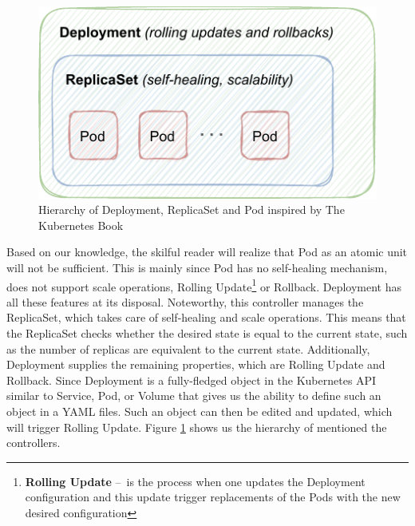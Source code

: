 \begin{enumerate}
    \begin{figure}[!htb]
        \centering
        \includegraphics[scale=1.2]{obrazky-figures/02-preliminaries/01-kubernetes/03-deplyoment-archite.pdf}
        \caption{Hierarchy of Deployment, ReplicaSet and Pod inspired by The Kubernetes Book \cite{kubernetesBook}}
        \label{fig:kubernetes:deploymentReplicaSetPod}
    \end{figure}
    Based on our knowledge, the skilful reader will realize that Pod as an atomic unit will not be sufficient. This is mainly since Pod has no self-healing mechanism, does not support scale operations, Rolling Update\footnote{\textbf{Rolling Update} \---\ is the process when one updates the Deployment configuration and this update trigger replacements of the Pods with the new desired configuration} or Rollback. Deployment has all these features at its disposal. Noteworthy, this controller manages the ReplicaSet, which takes care of self-healing and scale operations. This means that the ReplicaSet checks whether the desired state is equal to the current state, such as the number of replicas are equivalent to the current state. Additionally, Deployment supplies the remaining properties, which are Rolling Update and Rollback. Since Deployment is a fully-fledged object in the Kubernetes API similar to Service, Pod, or Volume that gives us the ability to define such an object in a YAML files. Such an object can then be edited and updated, which will trigger Rolling Update. Figure \ref{fig:kubernetes:deploymentReplicaSetPod} shows us the hierarchy of mentioned the controllers. 
    

\end{enumerate}
